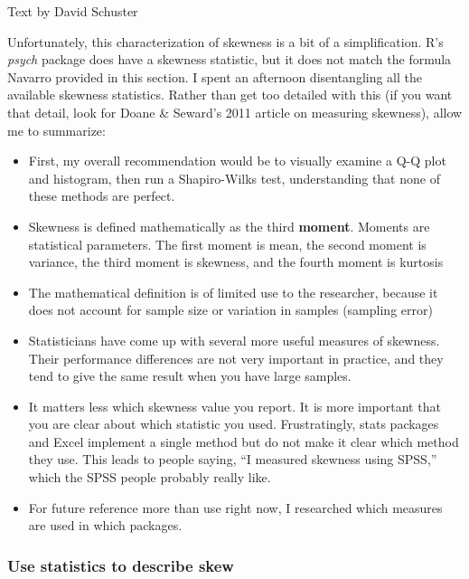 \documentclass[
]{book}
\begin{document}
Text by David Schuster

Unfortunately, this characterization of skewness is a bit of a simplification. R's \emph{psych} package does have a skewness statistic, but it does not match the formula Navarro provided in this section. I spent an afternoon disentangling all the available skewness statistics. Rather than get too detailed with this (if you want that detail, look for Doane \& Seward's 2011 article on measuring skewness), allow me to summarize:

\begin{itemize}
\item
  First, my overall recommendation would be to visually examine a Q-Q plot and histogram, then run a Shapiro-Wilks test, understanding that none of these methods are perfect.
\item
  Skewness is defined mathematically as the third \textbf{moment}. Moments are statistical parameters. The first moment is mean, the second moment is variance, the third moment is skewness, and the fourth moment is kurtosis
\item
  The mathematical definition is of limited use to the researcher, because it does not account for sample size or variation in samples (sampling error)
\item
  Statisticians have come up with several more useful measures of skewness. Their performance differences are not very important in practice, and they tend to give the same result when you have large samples.
\item
  It matters less which skewness value you report. It is more important that you are clear about which statistic you used. Frustratingly, stats packages and Excel implement a single method but do not make it clear which method they use. This leads to people saying, ``I measured skewness using SPSS,'' which the SPSS people probably really like.
\item
  For future reference more than use right now, I researched which measures are used in which packages.
\end{itemize}

\hypertarget{use-statistics-to-describe-skew}{%
\subsubsection{Use statistics to describe skew}\label{use-statistics-to-describe-skew}}
\end{document}
